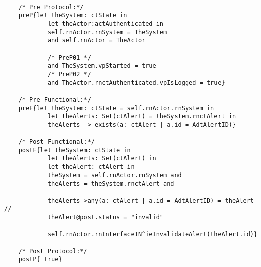 	\scriptsize
	\vspace{0.5cm}
	\begin{lstlisting}[style=MessirStyle,firstnumber=auto,captionpos=b,caption={\msrmessir (MCL-oriented) specification of the operation \emph{oeInvalidateAlert}.},label=OM-actCoordinator-oeInvalidateAlert-MCL-LST]

	/* Pre Protocol:*/ 
	preP{let theSystem: ctState in
	  		let theActor:actAuthenticated in
	  		self.rnActor.rnSystem = TheSystem
	  		and self.rnActor = TheActor
	  
			/* PreP01 */
	  		and TheSystem.vpStarted = true
			/* PreP02 */
	  		and TheActor.rnctAuthenticated.vpIsLogged = true}
	
	/* Pre Functional:*/
	preF{let theSystem: ctState = self.rnActor.rnSystem in
	  		let theAlerts: Set(ctAlert) = theSystem.rnctAlert in
	  		theAlerts -> exists(a: ctAlert | a.id = AdtAlertID)}
	
	/* Post Functional:*/ 
	postF{let theSystem: ctState in
	  		let theAlerts: Set(ctAlert) in
	  		let theAlert: ctAlert in
	  		theSystem = self.rnActor.rnSystem and
	  		theAlerts = theSystem.rnctAlert and
	  		
	  		theAlerts->any(a: ctAlert | a.id = AdtAlertID) = theAlert //
	  		theAlert@post.status = "invalid"
	  		
	  		self.rnActor.rnInterfaceIN^ieInvalidateAlert(theAlert.id)}
	
	/* Post Protocol:*/ 
	postP{ true}
	
	\end{lstlisting}
	\normalsize 
	
	
	
	





